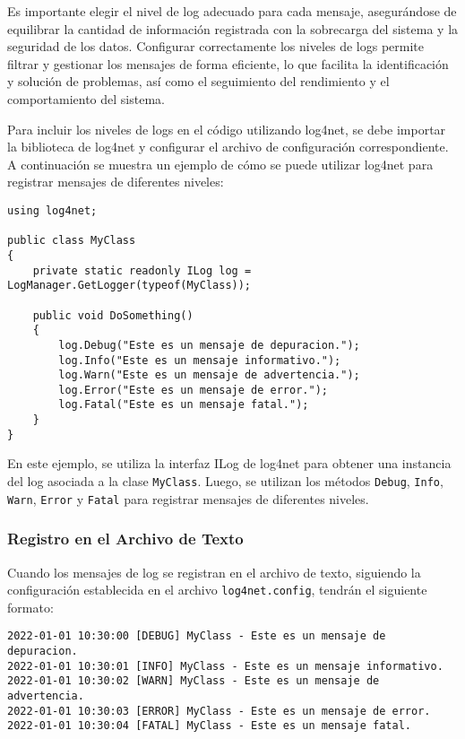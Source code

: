 \documentclass[executivepaper]{article}
\begin{document}
Es importante elegir el nivel de log adecuado para cada mensaje, asegurándose de equilibrar la cantidad de información registrada con la sobrecarga del sistema y la seguridad de los datos. Configurar correctamente los niveles de logs permite filtrar y gestionar los mensajes de forma eficiente, lo que facilita la identificación y solución de problemas, así como el seguimiento del rendimiento y el comportamiento del sistema.

Para incluir los niveles de logs en el código utilizando log4net, se debe importar la biblioteca de log4net y configurar el archivo de configuración correspondiente. A continuación se muestra un ejemplo de cómo se puede utilizar log4net para registrar mensajes de diferentes niveles:

\begin{lstlisting}
using log4net;

public class MyClass
{
    private static readonly ILog log = LogManager.GetLogger(typeof(MyClass));

    public void DoSomething()
    {
        log.Debug("Este es un mensaje de depuracion.");
        log.Info("Este es un mensaje informativo.");
        log.Warn("Este es un mensaje de advertencia.");
        log.Error("Este es un mensaje de error.");
        log.Fatal("Este es un mensaje fatal.");
    }
}
\end{lstlisting}

En este ejemplo, se utiliza la interfaz ILog de log4net para obtener una instancia del log asociada a la clase \texttt{MyClass}. Luego, se utilizan los métodos \texttt{Debug}, \texttt{Info}, \texttt{Warn}, \texttt{Error} y \texttt{Fatal} para registrar mensajes de diferentes niveles.

\subsubsection*{Registro en el Archivo de Texto}

Cuando los mensajes de log se registran en el archivo de texto, siguiendo la configuración establecida en el archivo \texttt{log4net.config}, tendrán el siguiente formato:

\begin{verbatim}
2022-01-01 10:30:00 [DEBUG] MyClass - Este es un mensaje de depuracion.
2022-01-01 10:30:01 [INFO] MyClass - Este es un mensaje informativo.
2022-01-01 10:30:02 [WARN] MyClass - Este es un mensaje de advertencia.
2022-01-01 10:30:03 [ERROR] MyClass - Este es un mensaje de error.
2022-01-01 10:30:04 [FATAL] MyClass - Este es un mensaje fatal.
\end{verbatim}
\end{document}
